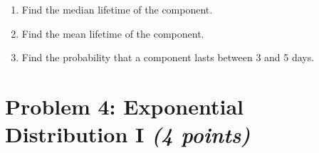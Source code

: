 \documentclass[11pt,twoside]{article}
\newcommand{\pts}[1]{\marginpar{ \small\hspace{0pt} \textit{[#1]} } }
\numberwithin{equation}{section}
\newcommand{\?}{\stackrel{?}{=}}
\begin{document}
\begin{enumerate}[\bf (a)]
 \item Find the median lifetime of the component. \pts{1}
 \vspace{20ex}
  
\item Find the mean lifetime of the component. \pts{2}
 \vspace{30ex}

\item Find the probability that a component lasts between 3 and 5 days. \pts{3}
  
\end{enumerate}

\eject


\section*{Problem 4: Exponential Distribution I \textit{(4 points)}}
\end{document}
